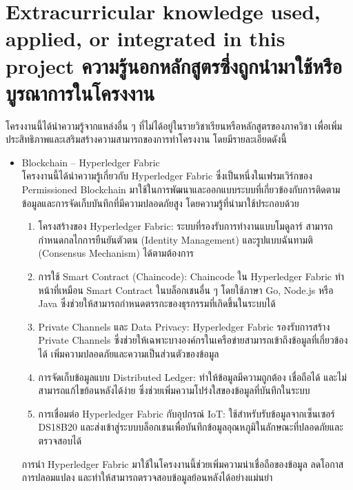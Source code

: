 \section{\ifenglish%
Extracurricular knowledge used, applied, or integrated in this project
\else%
ความรู้นอกหลักสูตรซึ่งถูกนำมาใช้หรือบูรณาการในโครงงาน
\fi
}

โครงงานนี้ได้นำความรู้จากแหล่งอื่น ๆ ที่ไม่ได้อยู่ในรายวิชาเรียนหรือหลักสูตรของภาควิชา เพื่อเพิ่มประสิทธิภาพและเสริมสร้างความสามารถของการทำโครงงาน โดยมีรายละเอียดดังนี้
\begin{itemize}
    \item Blockchain – Hyperledger Fabric \\
    โครงงานนี้ได้นำความรู้เกี่ยวกับ Hyperledger Fabric ซึ่งเป็นหนึ่งในเฟรมเวิร์กของ Permissioned Blockchain มาใช้ในการพัฒนาและออกแบบระบบที่เกี่ยวข้องกับการติดตามข้อมูลและการจัดเก็บบันทึกที่มีความปลอดภัยสูง โดยความรู้ที่นำมาใช้ประกอบด้วย
    \begin{enumerate}
        \item โครงสร้างของ Hyperledger Fabric: ระบบที่รองรับการทำงานแบบโมดูลาร์ สามารถกำหนดกลไกการยืนยันตัวตน (Identity Management) และรูปแบบฉันทามติ (Consensus Mechanism) ได้ตามต้องการ
        \item การใช้ Smart Contract (Chaincode): Chaincode ใน Hyperledger Fabric ทำหน้าที่เหมือน Smart Contract ในบล็อกเชนอื่น ๆ โดยใช้ภาษา Go, Node.js หรือ Java ซึ่งช่วยให้สามารถกำหนดตรรกะของธุรกรรมที่เกิดขึ้นในระบบได้
        \item Private Channels และ Data Privacy: Hyperledger Fabric รองรับการสร้าง Private Channels ซึ่งช่วยให้เฉพาะบางองค์กรในเครือข่ายสามารถเข้าถึงข้อมูลที่เกี่ยวข้องได้ เพิ่มความปลอดภัยและความเป็นส่วนตัวของข้อมูล
        \item การจัดเก็บข้อมูลแบบ Distributed Ledger: ทำให้ข้อมูลมีความถูกต้อง เชื่อถือได้ และไม่สามารถแก้ไขย้อนหลังได้ง่าย ซึ่งช่วยเพิ่มความโปร่งใสของข้อมูลที่บันทึกในระบบ
        \item การเชื่อมต่อ Hyperledger Fabric กับอุปกรณ์ IoT: ใช้สำหรับรับข้อมูลจากเซ็นเซอร์ DS18B20 และส่งเข้าสู่ระบบบล็อกเชนเพื่อบันทึกข้อมูลอุณหภูมิในลักษณะที่ปลอดภัยและตรวจสอบได้
    \end{enumerate}
    การนำ Hyperledger Fabric มาใช้ในโครงงานนี้ช่วยเพิ่มความน่าเชื่อถือของข้อมูล ลดโอกาสการปลอมแปลง และทำให้สามารถตรวจสอบข้อมูลย้อนหลังได้อย่างแม่นยำ
\end{itemize}
